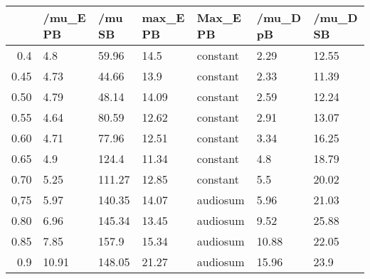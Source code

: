 \begin{table}[ht]
\centering
\begin{tabular}{rllllll}
  \hline
 & /mu\_E PB & /mu SB & max\_E PB & Max\_E PB & /mu\_D pB & /mu\_D SB \\ 
  \hline
0.4 & 4.8 & 59.96 & 14.5 & constant & 2.29 & 12.55 \\ 
  0.45 & 4.73 & 44.66 & 13.9 & constant & 2.33 & 11.39 \\ 
  0.50 & 4.79 & 48.14 & 14.09 & constant & 2.59 & 12.24 \\ 
  0.55 & 4.64 & 80.59 & 12.62 & constant & 2.91 & 13.07 \\ 
  0.60 & 4.71 & 77.96 & 12.51 & constant & 3.34 & 16.25 \\ 
  0.65 & 4.9 & 124.4 & 11.34 & constant & 4.8 & 18.79 \\ 
  0.70 & 5.25 & 111.27 & 12.85 & constant & 5.5 & 20.02 \\ 
  0,75 & 5.97 & 140.35 & 14.07 & audiosum & 5.96 & 21.03 \\ 
  0.80 & 6.96 & 145.34 & 13.45 & audiosum & 9.52 & 25.88 \\ 
  0.85 & 7.85 & 157.9 & 15.34 & audiosum & 10.88 & 22.05 \\ 
  0.9 & 10.91 & 148.05 & 21.27 & audiosum & 15.96 & 23.9 \\ 
   \hline
\end{tabular}
\end{table}
